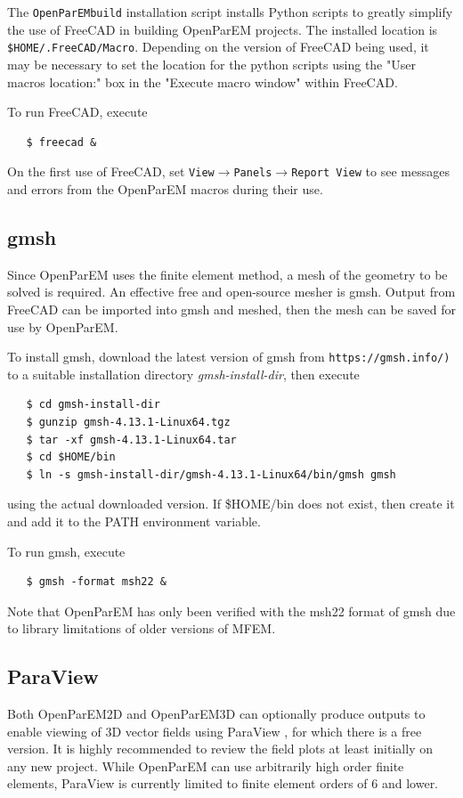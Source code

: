 \documentclass[titlepage]{article}
\renewcommand\_{\textunderscore\linebreak[1]}
\begin{document}
The \texttt{OpenParEM\_build} installation script installs Python scripts to greatly simplify the use of FreeCAD in building OpenParEM projects.  The installed location is \texttt{\$HOME/.FreeCAD/Macro}.  Depending on the version of FreeCAD being used, it may be necessary to set the location for the python scripts using the "User macros location:" box in the "Execute macro window" within FreeCAD.

To run FreeCAD, execute
\begin{verbatim}
   $ freecad &
\end{verbatim}
On the first use of FreeCAD, set \texttt{View}$\rightarrow$\texttt{Panels}$\rightarrow$\texttt{Report View} to see messages and errors from the OpenParEM macros during their use.

\subsection{gmsh}

Since OpenParEM uses the finite element method, a mesh of the geometry to be solved is required. An effective free and open-source mesher is gmsh. Output from FreeCAD can be imported into gmsh and meshed, then the mesh can be saved for use by OpenParEM.

To install gmsh, download the latest version of gmsh from \verb+https://gmsh.info/)+ to a suitable installation directory \textit{gmsh-install-dir},  then execute
\begin{verbatim}
   $ cd gmsh-install-dir
   $ gunzip gmsh-4.13.1-Linux64.tgz
   $ tar -xf gmsh-4.13.1-Linux64.tar
   $ cd $HOME/bin
   $ ln -s gmsh-install-dir/gmsh-4.13.1-Linux64/bin/gmsh gmsh
\end{verbatim}
using the actual downloaded version.  If \$HOME/bin does not exist, then create it and add it to the PATH environment variable.

To run gmsh, execute
\begin{verbatim}
   $ gmsh -format msh22 &
\end{verbatim}

\noindent Note that OpenParEM has only been verified with the msh22 format of gmsh due to library limitations of older versions of MFEM.

\subsection{ParaView}
\label{sec:paraview}

Both OpenParEM2D and OpenParEM3D can optionally produce outputs to enable viewing of 3D vector fields using ParaView \cite{paraview}, for which there is a free version. It is highly recommended to review the field plots at least initially on any new project.  While OpenParEM can use arbitrarily high order finite elements, ParaView is currently limited to finite element orders of 6 and lower.
\end{document}
